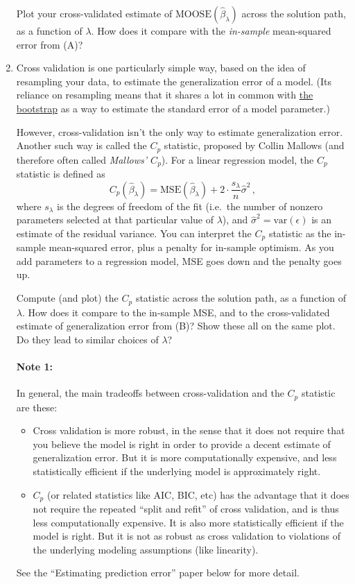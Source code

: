 \documentclass{article}
\begin{document}
\begin{enumerate}[label=(\Alph*)]
Plot your cross-validated estimate of $\mathrm{MOOSE}(\hat{\beta}_{\lambda})$ across the solution path, as a function of $\lambda$.  How does it compare with the \textit{in-sample} mean-squared error from (A)?

\item Cross validation is one particularly simple way, based on the idea of resampling your data, to estimate the generalization error of a model.  (Its reliance on resampling means that it shares a lot in common with \href{https://en.wikipedia.org/wiki/Bootstrapping_(statistics)}{the bootstrap} as a way to estimate the standard error of a model parameter.)

However, cross-validation isn't the only way to estimate generalization error.  Another such way is called the $C_p$ statistic, proposed by Collin Mallows (and therefore often called \textit{Mallows' $C_p$}).  For a linear regression model, the $C_p$ statistic is defined as
$$
C_p(\hat{\beta}_\lambda) = \mathrm{MSE}(\hat \beta_{\lambda}) + 2 \cdot \frac{s_{\lambda}}{n} \hat \sigma^2 \, ,
$$
where $s_{\lambda}$ is the degrees of freedom of the fit (i.e.~the number of nonzero parameters selected at that particular value of $\lambda$), and $\hat \sigma^2 = \mathrm{var}(\epsilon)$ is an estimate of the residual variance.  You can interpret the $C_p$ statistic as the in-sample mean-squared error, plus a penalty for in-sample optimism.  As you add parameters to a regression model, MSE goes down and the penalty goes up. 

Compute (and plot) the $C_p$ statistic across the solution path, as a function of $\lambda$.  How does it compare to the in-sample MSE, and to the cross-validated estimate of generalization error from (B)?  Show these all on the same plot.  Do they lead to similar choices of $\lambda$?

\paragraph{Note 1:} In general, the main tradeoffs between cross-validation and the $C_p$ statistic are these:
\begin{itemize}
\item  Cross validation is more robust, in the sense that it does not require that you believe the model is right in order to provide a decent estimate of generalization error.  But it is more computationally expensive, and less statistically efficient if the underlying model is approximately right.
\item $C_p$ (or related statistics like AIC, BIC, etc) has the advantage that it does not require the repeated ``split and refit'' of cross validation, and is thus less computationally expensive.  It is also more statistically efficient if the model is right.  But it is not as robust as cross validation to violations of the underlying modeling assumptions (like linearity).
\end{itemize}
See the ``Estimating prediction error'' paper below for more detail.


\end{enumerate}
\end{document}
